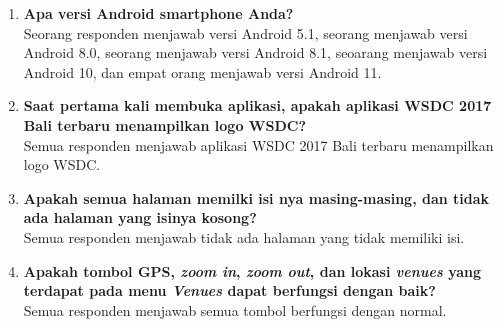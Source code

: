 \begin{enumerate}
	\item \textbf{Apa versi Android smartphone Anda?} \\
	Seorang responden menjawab versi Android 5.1, seorang menjawab versi Android 8.0, seorang menjawab versi Android 8.1, seoarang menjawab versi Android 10, dan empat orang menjawab versi Android 11.
	\item \textbf{Saat pertama kali membuka aplikasi, apakah aplikasi WSDC 2017 Bali terbaru menampilkan logo WSDC?} \\
	Semua responden menjawab aplikasi WSDC 2017 Bali terbaru menampilkan logo WSDC.
	\item \textbf{Apakah semua halaman memilki isi nya masing-masing, dan tidak ada halaman yang isinya kosong?} \\
	Semua responden menjawab tidak ada halaman yang tidak memiliki isi.
\newpage	
	\item \textbf{Apakah tombol GPS, \textit{zoom in}, \textit{zoom out}, dan lokasi \textit{venues} yang terdapat pada menu \textit{Venues} dapat berfungsi dengan baik?} \\
	Semua responden menjawab semua tombol berfungsi dengan normal.
	

\end{enumerate}
